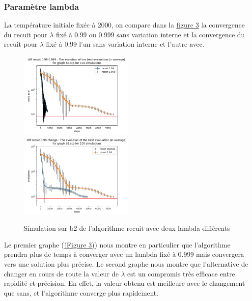 \documentclass[11pt,french]{report}
\begin{document}
        \subsubsection{Paramètre lambda}
        La température initiale fixée à 2000, on compare dans la \hyperref[Figure3]{figure 3} la convergence du recuit pour $\lambda$ fixé à 0.99 ou 0.999 sans variation interne et la convergence du recuit pour $\lambda$ fixé à 0.99 l'un sans variation interne et l'autre avec.
        \begin{figure}
        		\includegraphics[width=0.5\textwidth]{best_b2_evaluation_diff recuit 0.99 0.999.png}
        		\includegraphics[width=0.5\textwidth]{best_b2_evaluation_diff recuit 0.99 change.png}
        	\caption{Simulation sur b2 de l'algorithme recuit avec deux lambda différents}
        	\label{Figure3}
        \end{figure}
        
        Le premier graphe (\hyperref[Figure3]{(Figure 3)}) nous montre en particulier que l'algorithme prendra plus de temps à converger avec un lambda fixé à 0.999 mais convergera vers une solution plus précise. Le second graphe nous montre que l'alternative de changer en cours de route la valeur de $\lambda$ est un compromis très efficace entre rapidité et précision. En effet, la valeur obtenu est meilleure avec le changement que sans, et l'algorithme converge plus rapidement. 
\end{document}
